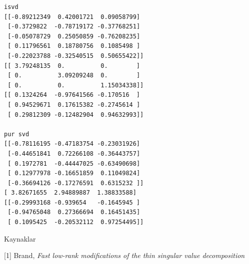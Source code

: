 \documentclass[12pt,fleqn]{article}\usepackage{../../common}
\begin{document}
\begin{verbatim}
isvd
[[-0.89212349  0.42001721  0.09058799]
 [-0.3729822  -0.78719172 -0.37768251]
 [-0.05078729  0.25050859 -0.76208235]
 [ 0.11796561  0.18780756  0.1085498 ]
 [-0.22023788 -0.32540515  0.50655422]]
[[ 3.79248135  0.          0.        ]
 [ 0.          3.09209248  0.        ]
 [ 0.          0.          1.15034338]]
[[ 0.1324264  -0.97641566 -0.170516  ]
 [ 0.94529671  0.17615382 -0.2745614 ]
 [ 0.29812309 -0.12482904  0.94632993]]

pur svd
[[-0.78116195 -0.47183754 -0.23031926]
 [-0.44651841  0.72266108 -0.36443757]
 [ 0.1972781  -0.44447025 -0.63490698]
 [ 0.12977978 -0.16651859  0.11049824]
 [-0.36694126 -0.17276591  0.6315232 ]]
[ 3.82671655  2.94889887  1.38833588]
[[-0.29993168 -0.939654   -0.1645945 ]
 [-0.94765048  0.27366694  0.16451435]
 [ 0.1095425  -0.20532112  0.97254495]]
\end{verbatim}

Kaynaklar

[1] Brand, {\em Fast low-rank modifications of the thin singular value decomposition}
\end{document}
